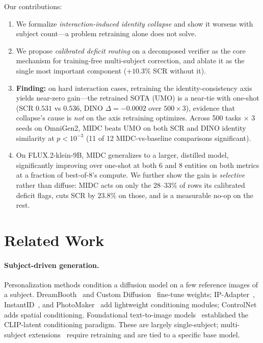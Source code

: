 \documentclass[letterpaper]{article}
\begin{document}
Our contributions:
\begin{enumerate}
\item We formalize \emph{interaction-induced identity collapse} and show it worsens with subject count---a problem retraining alone does not solve.
\item We propose \emph{calibrated deficit routing} on a decomposed verifier as the core mechanism for training-free multi-subject correction, and ablate it as the single most important component ($+10.3\%$ SCR without it).
\item \textbf{Finding:} on hard interaction cases, retraining the identity-consistency axis yields near-zero gain---the retrained SOTA (UMO) is a near-tie with one-shot (SCR $0.531$ vs $0.536$, DINO $\Delta{=}{-}0.0002$ over $500{\times}3$), evidence that collapse's cause is \emph{not} on the axis retraining optimizes. Across 500 tasks $\times$ 3 seeds on OmniGen2, MIDC beats UMO on both SCR and DINO identity similarity at $p{<}10^{-3}$ (11 of 12 MIDC-vs-baseline comparisons significant).
\item On FLUX.2-klein-9B, MIDC generalizes to a larger, distilled model, significantly improving over one-shot at both 6 and 8 entities on both metrics at a fraction of best-of-8's compute. We further show the gain is \emph{selective} rather than diffuse: MIDC acts on only the $28$--$33\%$ of rows its calibrated deficit flags, cuts SCR by $23.8\%$ on those, and is a measurable no-op on the rest.
\end{enumerate}

\section{Related Work}

\paragraph{Subject-driven generation.} Personalization methods condition a diffusion model on a few reference images of a subject. DreamBooth~\citep{ruiz2023dreambooth} and Custom Diffusion~\citep{kumari2023multi} fine-tune weights; IP-Adapter~\citep{ye2023ip}, InstantID~\citep{wang2024instantid}, and PhotoMaker~\citep{li2024photomaker} add lightweight conditioning modules; ControlNet~\citep{zhang2023adding} adds spatial conditioning. Foundational text-to-image models~\citep{ramesh2022hierarchical} established the CLIP-latent conditioning paradigm. These are largely single-subject; multi-subject extensions~\citep{xiao2023fastcomposer,gu2024mix,he2024uniportrait,she2025mosaic,chen2025xverse,wang2024ms,he2025anystory} require retraining and are tied to a specific base model.
\end{document}
